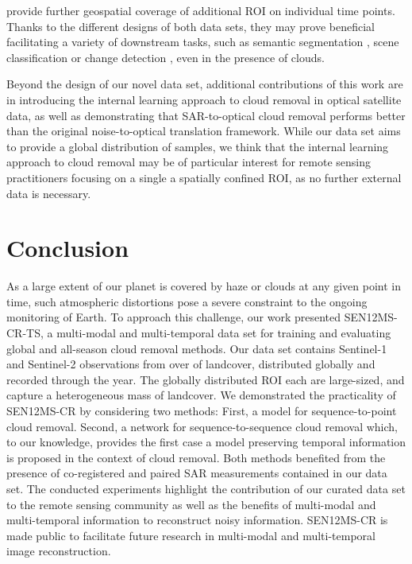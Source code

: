 \documentclass[journal]{IEEEtran}
\begin{document}
provide further geospatial coverage of additional ROI on individual time points. Thanks to the different designs of both data sets, they may prove beneficial facilitating a variety of downstream tasks, such as semantic segmentation \cite{schmitt2019sen12ms}, scene classification \cite{schmitt2021remote} or change detection \cite{ebel2021fusing}, even in the presence of clouds.

Beyond the design of our novel data set, additional contributions of this work are in introducing the internal learning approach to cloud removal in optical satellite data, as well as demonstrating that SAR-to-optical cloud removal performs better than the original noise-to-optical translation framework. While our data set aims to provide a global distribution of samples, we think that the internal learning approach to cloud removal may be of particular interest for remote sensing practitioners focusing on a single a spatially confined ROI, as no further external data is necessary. 

\section{Conclusion} \label{conclusion}

As a large extent of our planet is covered by haze or clouds at any given point in time, such atmospheric distortions pose a severe constraint to the ongoing monitoring of Earth. To approach this challenge, our work presented SEN12MS-CR-TS, a multi-modal and multi-temporal data set for training and evaluating global and all-season cloud removal methods. Our data set contains Sentinel-1 and Sentinel-2 observations from over   of landcover, distributed globally and recorded through the year. The globally distributed ROI each are large-sized, and capture a heterogeneous mass of landcover. We demonstrated the practicality of SEN12MS-CR by considering two methods: First, a model for sequence-to-point cloud removal. Second, a network for sequence-to-sequence cloud removal which, to our knowledge, provides the first case a model preserving temporal information is proposed in the context of cloud removal. Both methods benefited from the presence of co-registered and paired SAR measurements contained in our data set. The conducted experiments highlight the contribution of our curated data set to the remote sensing community as well as the benefits of multi-modal and multi-temporal information to reconstruct noisy information. SEN12MS-CR is made public to facilitate future research in multi-modal and multi-temporal image reconstruction.
\end{document}
